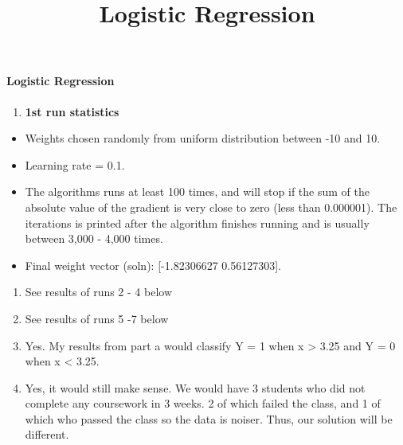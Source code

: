 \documentclass[11pt]{article}
\title{Logistic Regression}
\providecommand{\tightlist}{%
      \setlength{\itemsep}{0pt}\setlength{\parskip}{0pt}}
\begin{document}
    
    
    \maketitle
    
    

    
    \paragraph{Logistic Regression}\label{logistic-regression}

\begin{enumerate}
\def\labelenumi{\alph{enumi})}
\tightlist
\item
  \textbf{1st run statistics}
\end{enumerate}

\begin{itemize}
\tightlist
\item
  Weights chosen randomly from uniform distribution between -10 and
  10.\\
\item
  Learning rate = 0.1.
\item
  The algorithms runs at least 100 times, and will stop if the sum of
  the absolute value of the gradient is very close to zero (less than
  0.000001). The iterations is printed after the algorithm finishes
  running and is usually between 3,000 - 4,000 times.
\item
  Final weight vector (soln): {[}-1.82306627 0.56127303{]}.
\end{itemize}

\begin{enumerate}
\def\labelenumi{\alph{enumi})}
\setcounter{enumi}{1}
\item
  See results of runs 2 - 4 below
\item
  See results of runs 5 -7 below
\item
  Yes. My results from part a would classify Y = 1 when x \textgreater{}
  3.25 and Y = 0 when x \textless{} 3.25.
\item
  Yes, it would still make sense. We would have 3 students who did not
  complete any coursework in 3 weeks. 2 of which failed the class, and 1
  of which who passed the class so the data is noiser. Thus, our
  solution will be different.
\end{enumerate}
\end{document}
